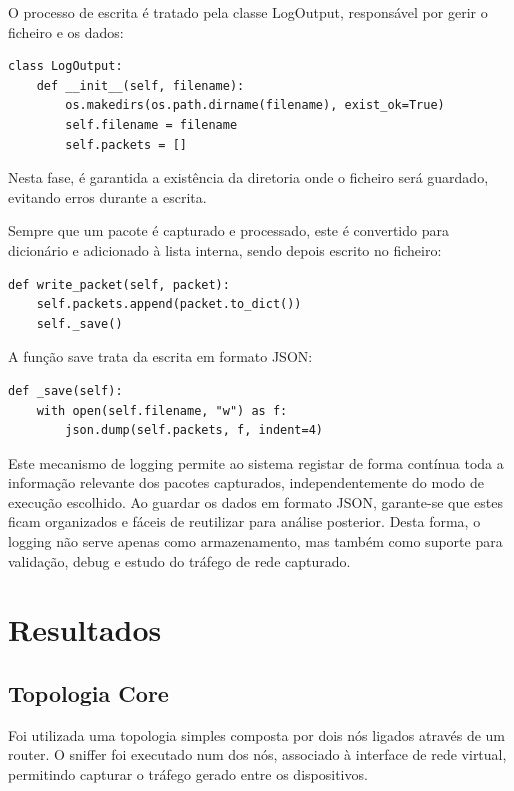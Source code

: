 \documentclass[a4paper]{article}
\begin{document}
O processo de escrita é tratado pela classe LogOutput, responsável por gerir o ficheiro e os dados:

\vspace{0.15cm}
\begin{lstlisting}
class LogOutput:
    def __init__(self, filename):
        os.makedirs(os.path.dirname(filename), exist_ok=True)
        self.filename = filename
        self.packets = []
\end{lstlisting}
\vspace{0.15cm}

Nesta fase, é garantida a existência da diretoria onde o ficheiro será guardado, evitando erros durante a escrita.

Sempre que um pacote é capturado e processado, este é convertido para dicionário e adicionado à lista interna, sendo depois escrito no ficheiro:

\vspace{0.15cm}
\begin{lstlisting}
def write_packet(self, packet):
    self.packets.append(packet.to_dict())
    self._save()
\end{lstlisting}
\vspace{0.15cm}

A função save trata da escrita em formato JSON:

\vspace{0.15cm}
\begin{lstlisting}
def _save(self):
    with open(self.filename, "w") as f:
        json.dump(self.packets, f, indent=4)
\end{lstlisting}
\vspace{0.15cm}


Este mecanismo de logging permite ao sistema registar de forma contínua toda a informação relevante dos pacotes capturados, independentemente do modo de execução escolhido. Ao guardar os dados em formato JSON, garante-se que estes ficam organizados e fáceis de reutilizar para análise posterior. Desta forma, o logging não serve apenas como armazenamento, mas também como suporte para validação, debug e estudo do tráfego de rede capturado.

\section{Resultados}
\subsection{Topologia Core}
Foi utilizada uma topologia simples composta por dois nós ligados através de um router. O sniffer foi executado num dos nós, associado à interface de rede virtual, permitindo capturar o tráfego gerado entre os dispositivos.
\end{document}
